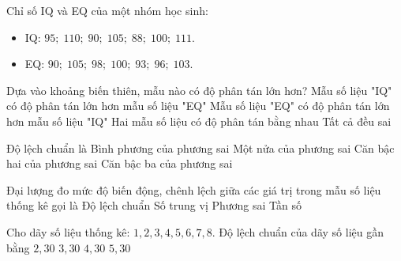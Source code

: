 \begin{ex}
	Chỉ số IQ và EQ của một nhóm học sinh:
	\begin{itemize}
		\item IQ: $95;\; 110;\; 90;\; 105;\; 88;\; 100;\; 111$.
		\item EQ: $90;\; 105;\; 98;\; 100;\; 93;\; 96;\; 103$.
	\end{itemize}
	Dựa vào khoảng biến thiên, mẫu nào có độ phân tán lớn hơn?
	\choice
	{\True Mẫu số liệu "IQ" có độ phân tán lớn hơn mẫu số liệu "EQ"}
	{Mẫu số liệu "EQ" có độ phân tán lớn hơn mẫu số liệu "IQ"}
	{Hai mẫu số liệu có độ phân tán bằng nhau}
	{Tất cả đều sai}
\end{ex}

\begin{ex}
	Độ lệch chuẩn là
	\choice
	{Bình phương của phương sai}
	{Một nửa của phương sai}
	{\True Căn bậc hai của phương sai}
	{Căn bậc ba của phương sai}
\end{ex}

\begin{ex}
	Đại lượng đo mức độ biến động, chênh lệch giữa các giá trị trong mẫu số liệu thống kê gọi là
	\choice
	{Độ lệch chuẩn}
	{Số trung vị}
	{\True Phương sai}
	{Tần số}
\end{ex}

\begin{ex}
	Cho dãy số liệu thống kê: $1, 2, 3, 4, 5, 6, 7, 8$. Độ lệch chuẩn của dãy số liệu gần bằng
	\choice
	{\True $2{,}30$}
	{$3{,}30$}
	{$4{,}30$}
	{$5{,}30$}
\end{ex}

